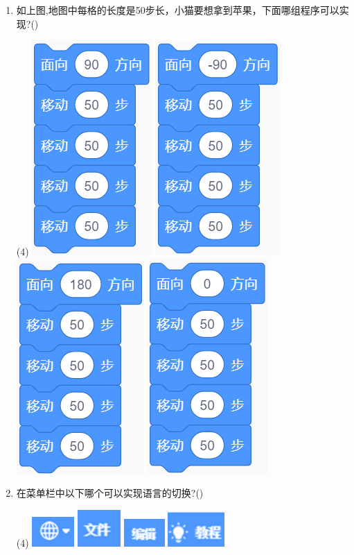 \documentclass[10.5pt, a4paper]{article}
\begin{document}
\begin{enumerate}
        \item 如上图,地图中每格的长度是50步长，小猫要想拿到苹果，下面哪组程序可以实现?(\qquad)
        \begin{tasks}(4)
            \task \includegraphics[width=.1\textwidth]{12a.png}
            \task \includegraphics[width=.1\textwidth]{12b.png}
            \task \includegraphics[width=.1\textwidth]{12c.png}
            \task \includegraphics[width=.1\textwidth]{12d.png}
        \end{tasks}

        \newpage
        \item 在菜单栏中以下哪个可以实现语言的切换?(\qquad)
        \begin{tasks}(4)
            \task \includegraphics[width=.08\textwidth]{13a.png}
            \task \includegraphics[width=.06\textwidth]{13b.png}
            \task \includegraphics[width=.08\textwidth]{13c.png}
            \task \includegraphics[width=.08\textwidth]{13d.png}
        \end{tasks}


\end{enumerate}
\end{document}
